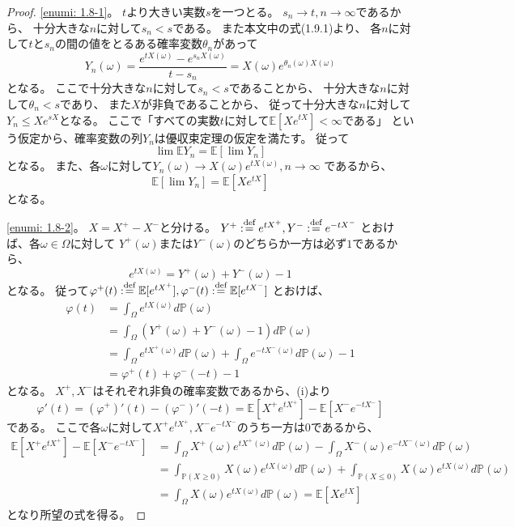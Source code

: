 \documentclass[uplatex]{jsarticle}
\theoremstyle{definition}
\def\P{\mathbb{P}}
\def\E{\mathbb{E}}
\def\dfn{:\overset{\mbox{{\scriptsize def}}}{=}}
\begin{document}
\begin{proof}
  \ref{enumi: 1.8-1}。
  \(t\)より大きい実数\(s\)を一つとる。
  \(s_n\to t , n\to \infty\)であるから、
  十分大きな\(n\)に対して\(s_n < s\)である。
  また本文中の式(1.9.1)より、
  各\(n\)に対して\(t\)と\(s_n\)の間の値をとるある確率変数\(\theta_n\)があって
  \[
  Y_n(\omega) = \frac{e^{tX(\omega)}-e^{s_nX(\omega)}}{t-s_n}
  = X(\omega)e^{\theta_n(\omega)X(\omega)}
  \]
  となる。
  ここで十分大きな\(n\)に対して\(s_n < s\)であることから、
  十分大きな\(n\)に対して\(\theta_n < s\)であり、
  また\(X\)が非負であることから、
  従って十分大きな\(n\)に対して\(Y_n \leq Xe^{sX}\)となる。
  ここで「すべての実数\(t\)に対して\(\E [Xe^{tX}] < \infty\)である」
  という仮定から、確率変数の列\(Y_n\)は優収束定理の仮定を満たす。
  従って
  \[
  \lim \E Y_n = \E \left[ \lim Y_n\right]
  \]
  となる。
  また、各\(\omega\)に対して\(Y_n(\omega) \to X(\omega)e^{tX(\omega)} , n\to \infty\)
  であるから、
  \[
  \E \left[ \lim Y_n\right] = \E[Xe^{tX}]
  \]
  となる。

  \ref{enumi: 1.8-2}。
  \(X = X^+-X^-\)と分ける。
  \(Y^+ \dfn e^{tX^+}, Y^- \dfn e^{-tX^-}\)
  とおけば、各\(\omega\in \Omega\)に対して
  \(Y^+(\omega)\)または\(Y^-(\omega)\)のどちらか一方は必ず\(1\)であるから、
  \[e^{tX(\omega)} = Y^+(\omega) + Y^-(\omega) - 1\]
  となる。
  従って\(\varphi^+(t) \dfn \E[e^{tX^+}] , \varphi^-(t) \dfn \E[e^{tX^-}]\)
  とおけば、
  \begin{align*}
    \varphi(t) &= \int_{\Omega}e^{tX(\omega)} d\P(\omega) \\
    &= \int_{\Omega}(Y^+(\omega) + Y^-(\omega) - 1) d\P(\omega) \\
    &= \int_{\Omega}e^{tX^+(\omega)}d\P(\omega)
    + \int_{\Omega}e^{-tX^-(\omega)}d\P(\omega) - 1 \\
    &= \varphi^+(t) + \varphi^-(-t) - 1
  \end{align*}
  となる。
  \(X^+,X^-\)はそれぞれ非負の確率変数であるから、(i)より
  \[
  \varphi'(t) = (\varphi^+)'(t) - (\varphi^-)'(-t)
  = \E[X^+e^{tX^+}] - \E[X^-e^{-tX^-}]
  \]
  である。
  ここで各\(\omega\)に対して\(X^+e^{tX^+},X^-e^{-tX^-}\)のうち一方は\(0\)であるから、
  \begin{align*}
    \E[X^+e^{tX^+}] - \E[X^-e^{-tX^-}]
    &= \int_{\Omega}X^+(\omega)e^{tX^+(\omega)}d\P(\omega)
    - \int_{\Omega}X^-(\omega)e^{-tX^-(\omega)}d\P(\omega)  \\
    &= \int_{\P(X\geq 0)}X(\omega)e^{tX(\omega)}d\P(\omega)
    + \int_{\P(X\leq 0)}X(\omega)e^{tX(\omega)}d\P(\omega)  \\
    &= \int_{\Omega}X(\omega)e^{tX(\omega)}d\P(\omega) = \E[Xe^{tX}]
  \end{align*}
  となり所望の式を得る。
\end{proof}
\end{document}
